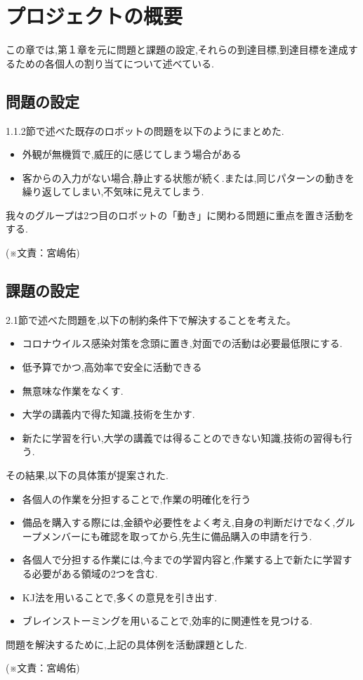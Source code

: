\chapter{プロジェクトの概要}
この章では,第１章を元に問題と課題の設定,それらの到達目標,到達目標を達成するための各個人の割り当てについて述べている.
\section{問題の設定}
1.1.2節で述べた既存のロボットの問題を以下のようにまとめた.
\begin{itemize}
    \item 外観が無機質で,威圧的に感じてしまう場合がある
    \item 客からの入力がない場合,静止する状態が続く.または,同じパターンの動きを繰り返してしまい,不気味に見えてしまう.
\end{itemize}
我々のグループは2つ目のロボットの「動き」に関わる問題に重点を置き活動をする.
\begin{flushright}
(※文責：宮嶋佑)
\end{flushright}
\section{課題の設定}
2.1節で述べた問題を,以下の制約条件下で解決することを考えた。
 \begin{itemize}
\item コロナウイルス感染対策を念頭に置き,対面での活動は必要最低限にする.
\item 低予算でかつ,高効率で安全に活動できる
\item 無意味な作業をなくす.
\item 大学の講義内で得た知識,技術を生かす.
\item 新たに学習を行い,大学の講義では得ることのできない知識,技術の習得も行う.
\end{itemize}
その結果,以下の具体策が提案された.
 \begin{itemize}
\item 各個人の作業を分担することで,作業の明確化を行う
\item   備品を購入する際には,金額や必要性をよく考え,自身の判断だけでなく,グループメンバーにも確認を取ってから,先生に備品購入の申請を行う.
\item 各個人で分担する作業には,今までの学習内容と,作業する上で新たに学習する必要がある領域の2つを含む.
\item KJ法を用いることで,多くの意見を引き出す.
\item ブレインストーミングを用いることで,効率的に関連性を見つける.
\end{itemize}
問題を解決するために,上記の具体例を活動課題とした.
\begin{flushright}
(※文責：宮嶋佑)
\end{flushright}

